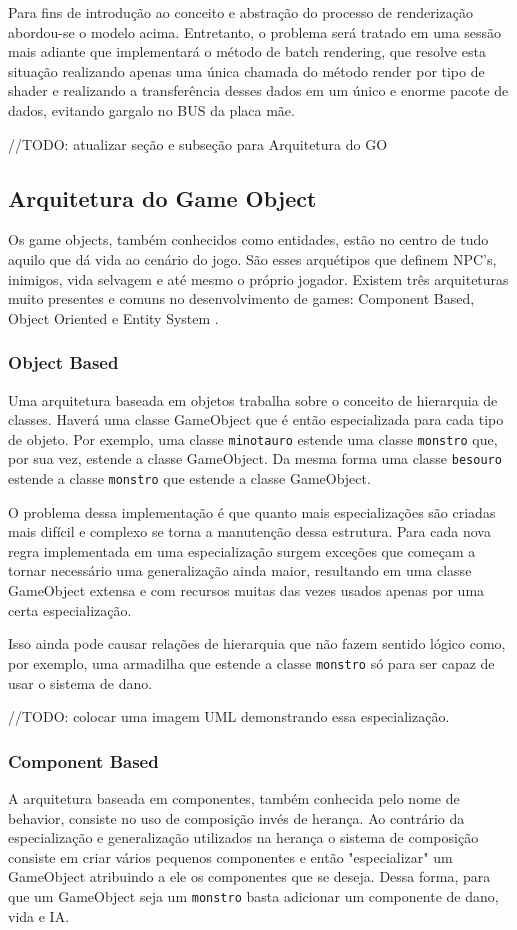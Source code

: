 \documentclass[12pt, 
openright, 
oneside, 
a4paper,    
brazil]{facom-ufu-abntex2}
\begin{document}
Para fins de introdução ao conceito e abstração do processo de renderização  abordou-se o modelo acima. Entretanto, o problema será tratado em uma sessão mais adiante que implementará o método de batch rendering, que resolve esta situação realizando apenas uma única chamada do método render por tipo de shader e realizando a transferência desses dados em um único e enorme pacote de dados, evitando gargalo no BUS da placa mãe.


//TODO: atualizar seção e subseção para Arquitetura do GO
\subsection{Arquitetura do Game Object}

Os game objects, também conhecidos como entidades, estão no centro de tudo aquilo que dá vida ao cenário do jogo. São esses arquétipos que definem NPC's, inimigos, vida selvagem e até mesmo o próprio jogador. Existem três arquiteturas muito presentes e comuns no desenvolvimento de games: Component Based, Object Oriented e Entity System \cite{GameObjectArchitecture}. 

\subsubsection{Object Based}
Uma arquitetura baseada em objetos trabalha sobre o conceito de hierarquia de classes. Haverá uma classe GameObject que é então especializada para cada tipo de objeto. Por exemplo, uma classe \texttt{minotauro} estende uma classe \texttt{monstro} que, por sua vez, estende a classe GameObject. Da mesma forma uma classe \texttt{besouro} estende a classe \texttt{monstro} que estende a classe GameObject.

O problema dessa implementação é que quanto mais especializações são criadas mais difícil e complexo se torna a manutenção dessa estrutura. Para cada nova regra implementada em uma especialização surgem exceções que começam a tornar necessário uma generalização ainda maior, resultando em uma classe GameObject extensa e com recursos muitas das vezes usados apenas por uma certa especialização.

Isso ainda pode causar relações de hierarquia que não fazem sentido lógico como, por exemplo, uma armadilha que estende a classe \texttt{monstro} só para ser capaz de usar o sistema de dano.

//TODO: colocar uma imagem UML demonstrando essa especialização. 

\subsubsection{Component Based}
A arquitetura baseada em componentes, também conhecida pelo nome de behavior, consiste no uso de composição invés de herança. Ao contrário da especialização e generalização utilizados na herança o sistema de composição consiste em criar vários pequenos componentes e então "especializar" um GameObject atribuindo a ele os componentes que se deseja. Dessa forma, para que um GameObject seja um \texttt{monstro} basta adicionar um componente de dano, vida e IA.
\end{document}
